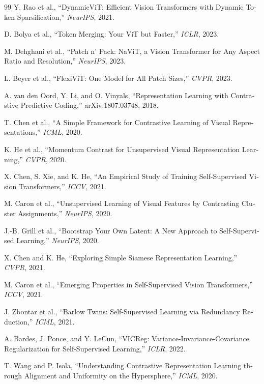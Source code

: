 \documentclass[12pt,openany,oneside]{book}
\begin{document}
\begin{latin}
\begin{thebibliography}{99}
Y. Rao et al.,
``DynamicViT: Efficient Vision Transformers with Dynamic Token Sparsification,''
\emph{NeurIPS}, 2021.

D. Bolya et al.,
``Token Merging: Your ViT but Faster,''
\emph{ICLR}, 2023.

M. Dehghani et al.,
``Patch n' Pack: NaViT, a Vision Transformer for Any Aspect Ratio and Resolution,''
\emph{NeurIPS}, 2023.

L. Beyer et al.,
``FlexiViT: One Model for All Patch Sizes,''
\emph{CVPR}, 2023.

A. van den Oord, Y. Li, and O. Vinyals,
``Representation Learning with Contrastive Predictive Coding,''
arXiv:1807.03748, 2018.

T. Chen et al.,
``A Simple Framework for Contrastive Learning of Visual Representations,''
\emph{ICML}, 2020.

K. He et al.,
``Momentum Contrast for Unsupervised Visual Representation Learning,''
\emph{CVPR}, 2020.

X. Chen, S. Xie, and K. He,
``An Empirical Study of Training Self-Supervised Vision Transformers,''
\emph{ICCV}, 2021.

M. Caron et al.,
``Unsupervised Learning of Visual Features by Contrasting Cluster Assignments,''
\emph{NeurIPS}, 2020.

J.-B. Grill et al.,
``Bootstrap Your Own Latent: A New Approach to Self-Supervised Learning,''
\emph{NeurIPS}, 2020.

X. Chen and K. He,
``Exploring Simple Siamese Representation Learning,''
\emph{CVPR}, 2021.

M. Caron et al.,
``Emerging Properties in Self-Supervised Vision Transformers,''
\emph{ICCV}, 2021.

J. Zbontar et al.,
``Barlow Twins: Self-Supervised Learning via Redundancy Reduction,''
\emph{ICML}, 2021.

A. Bardes, J. Ponce, and Y. LeCun,
``VICReg: Variance-Invariance-Covariance Regularization for Self-Supervised Learning,''
\emph{ICLR}, 2022.

T. Wang and P. Isola,
``Understanding Contrastive Representation Learning through Alignment and Uniformity on the Hypersphere,''
\emph{ICML}, 2020.


\end{thebibliography}
\end{latin}
\end{document}
